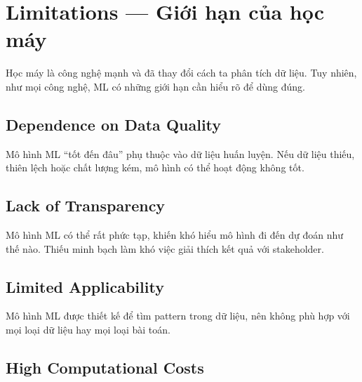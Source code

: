 \section{Limitations --- Giới hạn của học máy}

\begin{dongco}[title={ML mạnh, nhưng không phải lúc nào cũng phù hợp}]
Học máy là công nghệ mạnh và đã thay đổi cách ta phân tích dữ liệu.
Tuy nhiên, như mọi công nghệ, ML có những giới hạn cần hiểu rõ để dùng đúng.
\end{dongco}

\subsection{Dependence on Data Quality}

\begin{dinhnghia}[title={Phụ thuộc vào chất lượng dữ liệu}]
Mô hình ML “tốt đến đâu” phụ thuộc vào dữ liệu huấn luyện.
Nếu dữ liệu thiếu, thiên lệch hoặc chất lượng kém, mô hình có thể hoạt động không tốt.
\end{dinhnghia}

\subsection{Lack of Transparency}

\begin{dinhnghia}[title={Thiếu minh bạch}]
Mô hình ML có thể rất phức tạp, khiến khó hiểu mô hình đi đến dự đoán như thế nào.
Thiếu minh bạch làm khó việc giải thích kết quả với stakeholder.
\end{dinhnghia}

\subsection{Limited Applicability}

\begin{dinhnghia}[title={Khả năng áp dụng có giới hạn}]
Mô hình ML được thiết kế để tìm pattern trong dữ liệu, nên không phù hợp với mọi loại dữ liệu hay mọi loại bài toán.
\end{dinhnghia}

\subsection{High Computational Costs}


